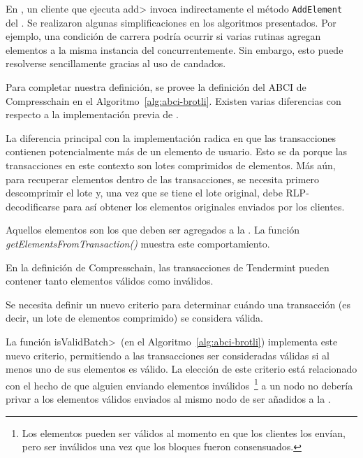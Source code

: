 



%
En \compresschain, un cliente que ejecuta \<add> invoca indirectamente el método \texttt{AddElement}
del \collector.
%
Se realizaron algunas simplificaciones en los algoritmos presentados. Por ejemplo, una condición de carrera
podría ocurrir si varias rutinas agregan elementos a la misma instancia del \collector concurrentemente.
Sin embargo, esto puede resolverse sencillamente gracias al uso de candados.



%
Para completar nuestra definición, se provee la definición del ABCI de Compresschain en el
Algoritmo~\ref{alg:abci-brotli}.
%
Existen varias diferencias con respecto a la implementación previa de \setchain.
%


La diferencia principal con la implementación \vanilla radica en que las transacciones contienen
potencialmente más de un elemento de usuario. Esto se da porque las transacciones en este contexto
son lotes comprimidos de elementos.
%
Más aún, para recuperar elementos dentro de las transacciones, se necesita primero descomprimir
el lote y, una vez que se tiene el lote original, debe RLP-decodificarse para así obtener los elementos
originales enviados por los clientes.

Aquellos elementos son los que deben ser agregados a la \setchain. La función \textit{getElementsFromTransaction()}
muestra este comportamiento.

En la definición de Compresschain, las transacciones de Tendermint pueden contener tanto elementos válidos
como inválidos.
%

Se necesita definir un nuevo criterio para determinar cuándo una transacción (es decir, un lote de elementos
comprimido) se considera válida.

%
La función \<isValidBatch>~(en el Algoritmo~\ref{alg:abci-brotli}) implementa este nuevo criterio, permitiendo
a las transacciones ser consideradas válidas si al menos uno de sus elementos es válido.
%
La elección de este criterio está relacionado con el hecho de que alguien enviando elementos inválidos~\footnote{
Los elementos pueden ser válidos al momento en que los clientes los envían, pero ser inválidos una vez que
los bloques fueron consensuados.} a un nodo no debería privar a los elementos válidos enviados al mismo nodo de
ser añadidos a la \setchain.

